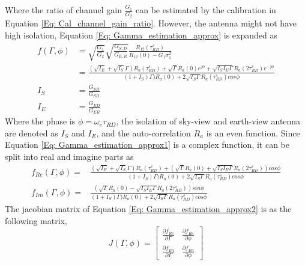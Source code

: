 \documentclass[draftcls,onecolumn]{IEEEtran}  %
\begin{document}
Where the ratio of channel gain $\frac{G_1}{G_2}$ can be estimated by the calibration in Equation \ref{Eq: Cal_channel_gain_ratio}. However, the antenna might not have high isolation, Equation \ref{Eq: Gamma_estimation_approx} is expanded as
\begin{align}
f(\Gamma, \phi)&=\sqrt{\frac{G_1}{G_2}}\sqrt{\frac{G_{S,D}}{G_{E,R}}} \frac{R_{12}(\tau^s_{RD})}{R_{12}(0)-G_1\sigma_1^2} \\
	&=\frac{(\sqrt{I_E}+\sqrt{I_S}\Gamma)R_a(\tau^s_{RD})+\sqrt{\Gamma} R_a(0)e^{j\phi}+\sqrt{I_S I_E\Gamma} R_a(2\tau^s_{RD})e^{-j\phi} }                              
                   {(1 + I_S)\Gamma)R_a(0)+2\sqrt{I_S\Gamma} R_a(\tau^s_{RD})cos\phi}  \\ 
                   I_S& = \frac{G_{SR}}{G_{SD}}\\
                   I_E& = \frac{G_{ED}}{G_{ER}}
    \label{Eq: Gamma_estimation_approx1}
\end{align}
Where   the phase is $\phi = \omega_e \tau_{RD}$, the isolation of sky-view and earth-view antenna are denoted as $I_S$ and $I_E$, and the auto-correlation $R_a$ is an even function.  Since Equation \ref{Eq: Gamma_estimation_approx1} is a complex function,  it can be split into real and imagine parts as
\begin{eqnarray}
f_{Re}(\Gamma, \phi)=&\frac{(\sqrt{I_E}+\sqrt{I_S}\Gamma)R_a(\tau^s_{RD})+(\sqrt{\Gamma} R_a(0)+\sqrt{I_S I_E\Gamma} R_a(2\tau^s_{RD}))cos\phi}                              
                   {(1 + I_S)\Gamma)R_a(0)+2\sqrt{I_S\Gamma} R_a(\tau^s_{RD})cos\phi}   \\
f_{Im}(\Gamma, \phi)=&\frac{(\sqrt{\Gamma} R_a(0)-\sqrt{I_S I_E\Gamma} R_a(2\tau^s_{RD}))sin\phi }                             
                   {(1 + I_S)\Gamma)R_a(0)+2\sqrt{I_S\Gamma} R_a(\tau^s_{RD})cos\phi}   
    \label{Eq: Gamma_estimation_approx2}
\end{eqnarray}
The jacobian matrix of Equation \ref{Eq: Gamma_estimation_approx2} is as the following matrix, 
\begin{equation}
    J(\Gamma, \phi) =
    \begin{bmatrix}
        \frac{\partial f_{Re}}{\partial \Gamma}      &  \frac{\partial f_{Re}}{\partial \phi}  \\
        \frac{\partial f_{Im}}{\partial \Gamma}      &  \frac{\partial f_{Im}}{\partial \phi}  
    \end{bmatrix} \label{Eq: Jacobian}
\end{equation}
\end{document}
